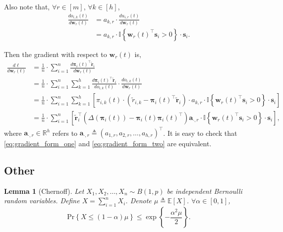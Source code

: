 \documentclass[10pt]{article}
\def\rva{{\mathbf{a}}}
\def\rvs{{\mathbf{s}}}
\def\rvw{{\mathbf{w}}}
\def\rvtilder{{\tilde{\mathbf{r}}}}
\def\pr{{\text{Pr}}}
\newtheorem{lem}{Lemma}
\def\rvpi{{\boldsymbol{\pi}}}
\def\sE{{\mathbb{E}}}
\def\sR{{\mathbb{R}}}
\def\sI{{\mathbb{I}}}
\begin{document}
\noindent Also note that, $\forall r \in [m]$, $\forall k \in [h]$,
\begin{equation*}
\begin{split}
    \frac{d o_{i,k}(t)}{d \rvw_r(t)} &= a_{k,r} \cdot \frac{d u_{i,r}(t)}{d \rvw_r(t)} \\
    &= a_{k,r} \cdot \sI\left\{ \rvw_r(t)^\top \rvs_i > 0 \right\} \cdot \rvs_i.
\end{split}
\end{equation*}

\noindent Then the gradient with respect to $\rvw_r(t)$ is,
\begin{equation}
\label{eq:gradient_form_two}
\begin{split}
    \frac{d\ell}{d \rvw_r(t)} &= \frac{1}{n} \cdot \sum\limits_{i=1}^{n}{ \frac{d \rvpi_i(t)^\top \rvtilder_i}{d \rvw_r(t)} } \\
    &= \frac{1}{n} \cdot \sum\limits_{i=1}^{n}{ \sum\limits_{k=1}^{h}{ \frac{d \rvpi_i(t)^\top \rvtilder_i}{d o_{i,k}(t)}\cdot \frac{d o_{i,k}(t)}{d \rvw_r(t)} } } \\
    &= \frac{1}{n} \cdot \sum\limits_{i=1}^{n}{ \sum\limits_{k=1}^{h}{ \left[ \pi_{i,k}(t) \cdot \left( \tilde{r}_{i, k} - \rvpi_i(t)^\top \rvtilder_i \right) \cdot a_{k,r} \cdot \sI\left\{ \rvw_r(t)^\top \rvs_i > 0 \right\} \cdot \rvs_i  \right] }  } \\
    &= \frac{1}{n} \cdot \sum\limits_{i=1}^{n}{ \left[ \rvtilder_i^\top \left( \Delta\left( \rvpi_i(t) \right) - \rvpi_i(t) \rvpi_i(t)^\top \right) \rva_{\cdot, r} \cdot \sI\left\{ \rvw_r(t)^\top \rvs_i > 0 \right\} \cdot \rvs_i  \right] },
\end{split}
\end{equation}
where $\rva_{\cdot, r} \in \sR^h$ refers to $\rva_{\cdot, r} \triangleq \left( a_{1,r}, a_{2,r}, \dots, a_{h,r} \right)^\top$. It is easy to check that \cref{eq:gradient_form_one} and \cref{eq:gradient_form_two} are equivalent.

\subsection{Other}

\begin{lem}[Chernoff]
    Let $X_1, X_2, \dots, X_n \sim B(1, p)$ be independent Bernoulli random variables. Define $X = \sum\limits_{i=1}^{n}{ X_i  }$. Denote $\mu \triangleq \sE\left[ X \right]$. $\forall \alpha \in [0,1]$,
\begin{equation*}
    \pr\left\{ X \le (1 - \alpha) \mu \right\} \le \exp\left\{ - \frac{\alpha^2 \mu}{2} \right\}.
\end{equation*}
\end{lem}
\end{document}
